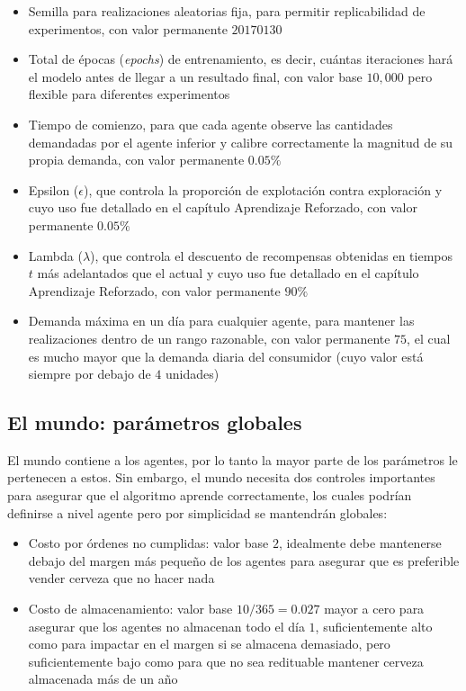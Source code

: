 \begin{itemize}
    \item Semilla para realizaciones aleatorias fija, para permitir replicabilidad de experimentos, con valor permanente $20170130$
    \item Total de \'epocas (\textit{epochs}) de entrenamiento, es decir, cu\'antas iteraciones har\'a el modelo antes de llegar a un resultado final, con valor base $10,000$ pero flexible para diferentes experimentos
    \item Tiempo de comienzo, para que cada agente observe las cantidades demandadas por el agente inferior y calibre correctamente la magnitud de su propia demanda, con valor permanente $0.05\%$
    \item Epsilon ($\epsilon$), que controla la proporci\'on de explotaci\'on contra exploraci\'on y cuyo uso fue detallado en el cap\'itulo Aprendizaje Reforzado, con valor permanente $0.05\%$
    \item Lambda ($\lambda$), que controla el descuento de recompensas obtenidas en tiempos $t$ m\'as adelantados que el actual y cuyo uso fue detallado en el cap\'itulo Aprendizaje Reforzado, con valor permanente $90\%$
    \item Demanda m\'axima en un d\'ia para cualquier agente, para mantener las realizaciones dentro de un rango razonable, con valor permanente $75$, el cual es mucho mayor que la demanda diaria del consumidor (cuyo valor est\'a siempre por debajo de $4$ unidades)
\end{itemize}

\subsection{El mundo: par\'ametros globales}

El mundo contiene a los agentes, por lo tanto la mayor parte de los par\'ametros le pertenecen a estos. Sin embargo, el mundo necesita dos controles importantes para asegurar que el algoritmo aprende correctamente, los cuales podr\'ian definirse a nivel agente pero por simplicidad se mantendr\'an globales:

\begin{itemize}
    \item Costo por \'ordenes no cumplidas: valor base $2$, idealmente debe mantenerse debajo del margen m\'as peque\~no de los agentes para asegurar que es preferible vender cerveza que no hacer nada
    \item Costo de almacenamiento: valor base $10/365 = 0.027$ mayor a cero para asegurar que los agentes no almacenan todo el d\'ia $1$, suficientemente alto como para impactar en el margen si se almacena demasiado, pero suficientemente bajo como para que no sea redituable mantener cerveza almacenada m\'as de un a\~no
\end{itemize}

